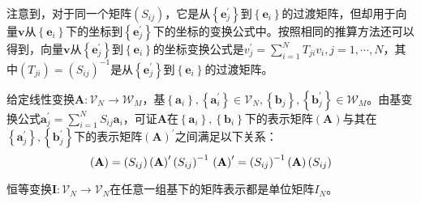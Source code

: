 \documentclass[main.tex]{subfiles}
\begin{document}
注意到，对于同一个矩阵$\left(S_{ij}\right)$，它是从$\left\{\mathbf{e}^\prime_j\right\}$到$\left\{\mathbf{e}_i\right\}$的过渡矩阵，但却用于向量$\mathbf{v}$从$\left\{\mathbf{e}_i\right\}$下的坐标到$\left\{\mathbf{e}^\prime_j\right\}$下的坐标的变换公式中。按照相同的推算方法还可以得到，向量$\mathbf{v}$从$\left\{\mathbf{e}^\prime_j\right\}$到$\left\{\mathbf{e}_i\right\}$的坐标变换公式是$v^\prime_j=\sum_{i=1}^NT_{ji}v_i,j=1,\cdots,N$，其中$\left(T_{ji}\right)=\left(S_{ij}\right)^{-1}$是从$\left\{\mathbf{e}^\prime_j\right\}$到$\left\{\mathbf{e}_i\right\}$的过渡矩阵。

\begin{theorem}
给定线性变换$\mathbf{A}:\mathcal{V}_N\rightarrow\mathcal{W}_M$，基$\left\{\mathbf{a}_i\right\},\left\{\mathbf{a}^\prime_i\right\}\in\mathcal{V}_N,\left\{\mathbf{b}_j\right\},\left\{\mathbf{b}^\prime_j\right\}\in\mathcal{W}_M$。由基变换公式$\mathbf{a}^\prime_j=\sum_{i=1}^NS_{ij}\mathbf{a}_i$，可证$\mathbf{A}$在$\left\{\mathbf{a}_i\right\},\left\{\mathbf{b}_i\right\}$下的表示矩阵$\left(\mathbf{A}\right)$与其在$\left\{\mathbf{a}^\prime_j\right\},\left\{\mathbf{b}^\prime_j\right\}$下的表示矩阵$\left(\mathbf{A}\right)^\prime$之间满足以下关系：
\[\left(\mathbf{A}\right)=\left(S_{ij}\right)\left(\mathbf{A}\right)^\prime\left(S_{ij}\right)^{-1}\\\left(\mathbf{A}\right)^\prime=\left(S_{ij}\right)^{-1}\left(\mathbf{A}\right)\left(S_{ij}\right)\]
\end{theorem}

\begin{theorem}
恒等变换$\mathbf{I}:\mathcal{V}_N\rightarrow\mathcal{V}_N$在任意一组基下的矩阵表示都是单位矩阵$I_N$。
\end{theorem}
\end{document}

